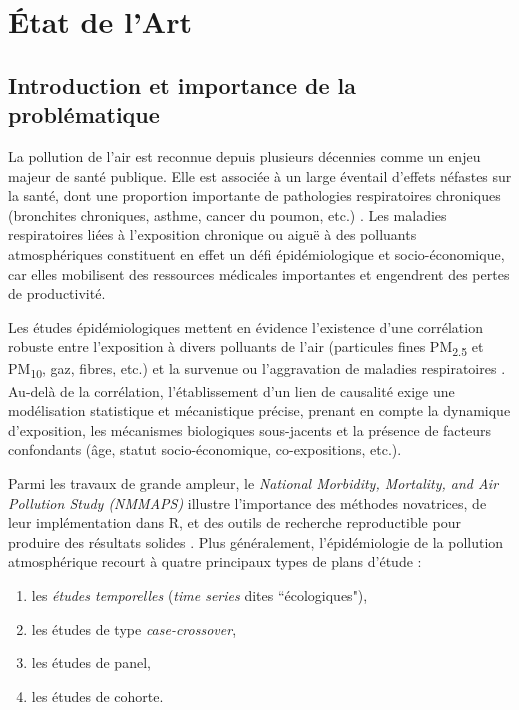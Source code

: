 \chapter{\'Etat de l'Art}
\label{ch:stateart}

\section{Introduction et importance de la problématique}
La pollution de l’air est reconnue depuis plusieurs décennies comme un enjeu majeur de santé publique. Elle est associée à un large éventail d’effets néfastes sur la santé, dont une proportion importante de pathologies respiratoires chroniques (bronchites chroniques, asthme, cancer du poumon, etc.) \citep{Bang2015,Donaldson2010,Mazurek2017}. Les maladies respiratoires liées à l’exposition chronique ou aiguë à des polluants atmosphériques constituent en effet un défi épidémiologique et socio-économique, car elles mobilisent des ressources médicales importantes et engendrent des pertes de productivité.

Les études épidémiologiques mettent en évidence l’existence d’une corrélation robuste entre l’exposition à divers polluants de l’air (particules fines PM\textsubscript{2.5} et PM\textsubscript{10}, gaz, fibres, etc.) et la survenue ou l’aggravation de maladies respiratoires \citep{Cho2011,Gomes2014}. Au-delà de la corrélation, l’établissement d’un lien de causalité exige une modélisation statistique et mécanistique précise, prenant en compte la dynamique d’exposition, les mécanismes biologiques sous-jacents et la présence de facteurs confondants (âge, statut socio-économique, co-expositions, etc.).

Parmi les travaux de grande ampleur, le \emph{National Morbidity, Mortality, and Air Pollution Study (NMMAPS)} illustre l’importance des méthodes novatrices, de leur implémentation dans \textsf{R}, et des outils de recherche reproductible pour produire des résultats solides \citep{DominiciMcDermottDaniels2003,SametDominiciZeger2000,SametZegerDominici2000,SametDominiciCurriero2000,DominiciSametZeger2000,BellMcDermottZeger2004,PengDominiciPastorBarriuso2005,DominiciPengZeger2007}. Plus généralement, l’épidémiologie de la pollution atmosphérique recourt à quatre principaux types de plans d’étude :

\begin{enumerate}
	\item les \emph{études temporelles} (\emph{time series} dites ``écologiques"),
	\item les études de type \emph{case-crossover},
	\item les études de panel,
	\item les études de cohorte.
\end{enumerate}

